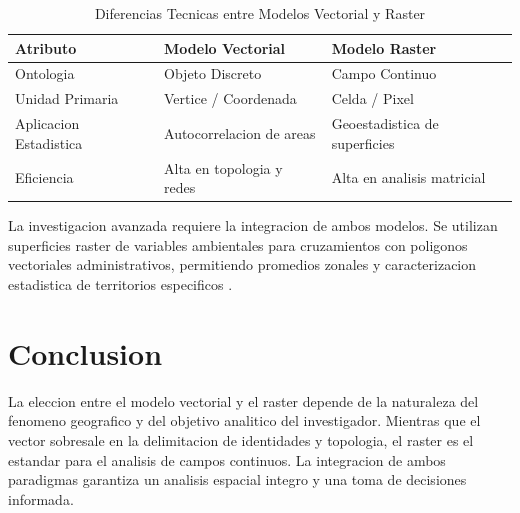 \documentclass[11pt,a4paper]{article}
\begin{document}
\begin{table}[H]
\centering
\caption{Diferencias Tecnicas entre Modelos Vectorial y Raster}
\begin{tabular}{@{}lll@{}}
\toprule
\textbf{Atributo} & \textbf{Modelo Vectorial} & \textbf{Modelo Raster} \\ \midrule
Ontologia & Objeto Discreto & Campo Continuo \\
Unidad Primaria & Vertice / Coordenada & Celda / Pixel \\
Aplicacion Estadistica & Autocorrelacion de areas & Geoestadistica de superficies \\
Eficiencia & Alta en topologia y redes & Alta en analisis matricial \\ \bottomrule
\end{tabular}
\end{table}

La investigacion avanzada requiere la integracion de ambos modelos. Se utilizan superficies raster de variables ambientales para cruzamientos con poligonos vectoriales administrativos, permitiendo promedios zonales y caracterizacion estadistica de territorios especificos \cite{giofandi2023comparison}.

\section{Conclusion}
La eleccion entre el modelo vectorial y el raster depende de la naturaleza del fenomeno geografico y del objetivo analitico del investigador. Mientras que el vector sobresale en la delimitacion de identidades y topologia, el raster es el estandar para el analisis de campos continuos. La integracion de ambos paradigmas garantiza un analisis espacial integro y una toma de decisiones informada.



\end{document}
